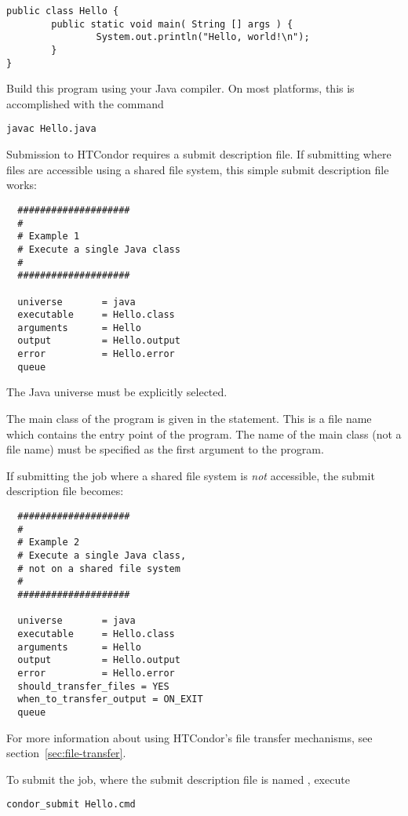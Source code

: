 \begin{verbatim}
public class Hello {
        public static void main( String [] args ) {
                System.out.println("Hello, world!\n");
        }
}
\end{verbatim}

Build this program using your Java compiler.
On most platforms, this is
accomplished with the command
\begin{verbatim}
javac Hello.java
\end{verbatim}

Submission to HTCondor requires a submit description file.
If submitting where files are accessible using a
shared file system,
this simple submit description file works:

\begin{verbatim}
  ####################
  #
  # Example 1
  # Execute a single Java class
  #
  ####################

  universe       = java
  executable     = Hello.class
  arguments      = Hello
  output         = Hello.output
  error          = Hello.error
  queue
\end{verbatim}

The Java universe must be explicitly selected.

The main class of the program is given in the  statement.
This is a file name which contains the entry point of the program.
The name of the main class (not a file name) must
be specified as the first argument to the program.

If submitting the job where a shared file system is \emph{not}
accessible,
the submit description file becomes:

\begin{verbatim}
  ####################
  #
  # Example 2
  # Execute a single Java class,
  # not on a shared file system
  #
  ####################

  universe       = java
  executable     = Hello.class
  arguments      = Hello
  output         = Hello.output
  error          = Hello.error
  should_transfer_files = YES
  when_to_transfer_output = ON_EXIT
  queue
\end{verbatim}
For more information about using HTCondor's file transfer mechanisms,
see section~\ref{sec:file-transfer}.

To submit the job, where the submit description file
is named , 
execute 
\begin{verbatim}
condor_submit Hello.cmd
\end{verbatim}

